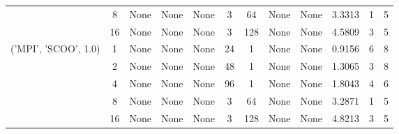 \begin{tabular}{cccccccccccc}
& 8& None& None& None& 3& 64& None& None& 3.3313& 1& 5\\
& 16& None& None& None& 3& 128& None& None& 4.5809& 3& 5\\
\hline
\multirow{5}{*}{('MPI', 'SCOO', 1.0)}& 1& None& None& None& 24& 1& None& None& 0.9156& 6& 8\\
& 2& None& None& None& 48& 1& None& None& 1.3065& 3& 8\\
& 4& None& None& None& 96& 1& None& None& 1.8043& 4& 6\\
& 8& None& None& None& 3& 64& None& None& 3.2871& 1& 5\\
& 16& None& None& None& 3& 128& None& None& 4.8213& 3& 5\\
\hline
\end{tabular}
